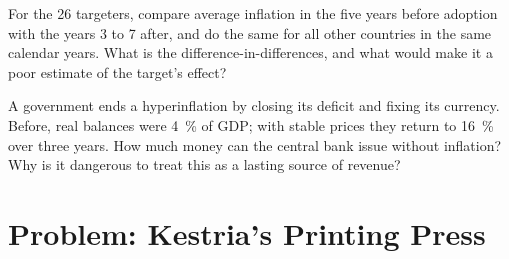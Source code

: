 \begin{exercise}[$\star\star\star$]\label{exo:b3:inflation-evidence:11}
For the 26 targeters, compare average inflation in the five years before adoption
with the years 3 to 7 after, and do the same for all other countries in the same
calendar years. What is the difference-in-differences, and what would make it a
poor estimate of the target's effect?
\end{exercise}

\begin{exercise}[$\star\star\star$]\label{exo:b3:inflation-evidence:12}
A government ends a hyperinflation by closing its deficit and fixing its currency.
Before, real balances were 4~\% of GDP; with stable prices they return to 16~\% over
three years. How much money can the central bank issue without inflation? Why is it
dangerous to treat this as a lasting source of revenue?
\end{exercise}

\section{Problem: Kestria's Printing Press}\label{sec:b3:inflation-evidence:problem}


